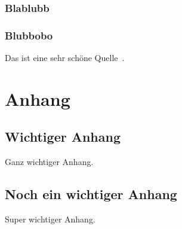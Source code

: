 \documentclass{bht-thesis}
\newcounter{savepage}
\begin{document}
\subsection{Blablubb}
\blindtext[4]
\blindtext[2]
\blindtext[3]
\subsection{Blubbobo}
Das ist eine sehr schöne Quelle~\cite{Nobody06}.

\cleardoublepage
{}
\setcounter{page}{\thesavepage}



\cleardoublepage
\appendix
\chapter{Anhang}
\section{Wichtiger Anhang}
Ganz wichtiger Anhang.
\section{Noch ein wichtiger Anhang}
Super wichtiger Anhang.

\cleardoublepage
{}
\statutorydeclaration
\end{document}
